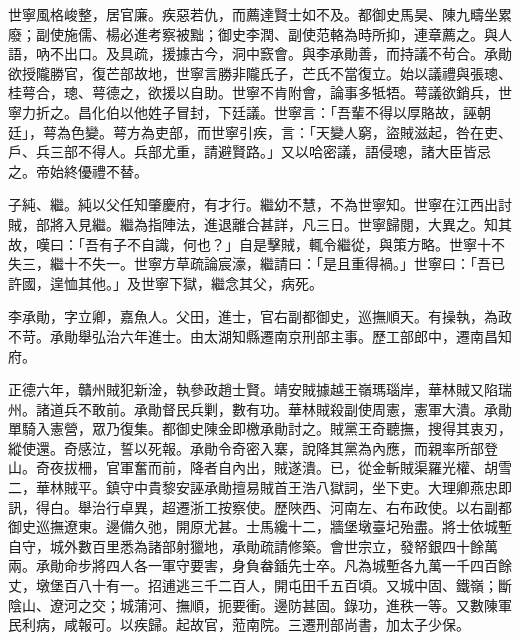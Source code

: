 \begin{pinyinscope}
世寧風格峻整，居官廉。疾惡若仇，而薦達賢士如不及。都御史馬昊、陳九疇坐累廢；副使施儒、楊必進考察被黜；御史李潤、副使范輅為時所抑，連章薦之。與人語，吶不出口。及具疏，援據古今，洞中窾會。與李承勛善，而持議不茍合。承勛欲授隴勝官，復芒部故地，世寧言勝非隴氏子，芒氏不當復立。始以議禮與張璁、桂萼合，璁、萼德之，欲援以自助。世寧不肯附會，論事多牴牾。萼議欲銷兵，世寧力折之。昌化伯以他姓子冒封，下廷議。世寧言：「吾輩不得以厚賂故，誣朝廷」，萼為色變。萼方為吏部，而世寧引疾，言：「天變人窮，盜賊滋起，咎在吏、戶、兵三部不得人。兵部尤重，請避賢路。」又以哈密議，語侵璁，諸大臣皆忌之。帝始終優禮不替。

子純、繼。純以父任知肇慶府，有才行。繼幼不慧，不為世寧知。世寧在江西出討賊，部將入見繼。繼為指陣法，進退離合甚詳，凡三日。世寧歸閱，大異之。知其故，嘆曰：「吾有子不自識，何也？」自是擊賊，輒令繼從，與策方略。世寧十不失三，繼十不失一。世寧方草疏論宸濠，繼請曰：「是且重得禍。」世寧曰：「吾已許國，遑恤其他。」及世寧下獄，繼念其父，病死。

李承勛，字立卿，嘉魚人。父田，進士，官右副都御史，巡撫順天。有操執，為政不苛。承勛舉弘治六年進士。由太湖知縣遷南京刑部主事。歷工部郎中，遷南昌知府。

正德六年，贛州賊犯新淦，執參政趙士賢。靖安賊據越王嶺瑪瑙岸，華林賊又陷瑞州。諸道兵不敢前。承勛督民兵剿，數有功。華林賊殺副使周憲，憲軍大潰。承勛單騎入憲營，眾乃復集。都御史陳金即檄承勛討之。賊黨王奇聽撫，搜得其衷刃，縱使還。奇感泣，誓以死報。承勛令奇密入寨，說降其黨為內應，而親率所部登山。奇夜拔柵，官軍奮而前，降者自內出，賊遂潰。已，從金斬賊渠羅光權、胡雪二，華林賊平。鎮守中貴黎安誣承勛擅易賊首王浩八獄詞，坐下吏。大理卿燕忠即訊，得白。舉治行卓異，超遷浙工按察使。歷陜西、河南左、右布政使。以右副都御史巡撫遼東。邊備久弛，開原尤甚。士馬纔十二，牆堡墩臺圮殆盡。將士依城塹自守，城外數百里悉為諸部射獵地，承勛疏請修築。會世宗立，發帑銀四十餘萬兩。承勛命步將四人各一軍守要害，身負畚鍤先士卒。凡為城塹各九萬一千四百餘丈，墩堡百八十有一。招逋逃三千二百人，開屯田千五百頃。又城中固、鐵嶺；斷陰山、遼河之交；城蒲河、撫順，扼要衝。邊防甚固。錄功，進秩一等。又數陳軍民利病，咸報可。以疾歸。起故官，蒞南院。三遷刑部尚書，加太子少保。


\end{pinyinscope}
